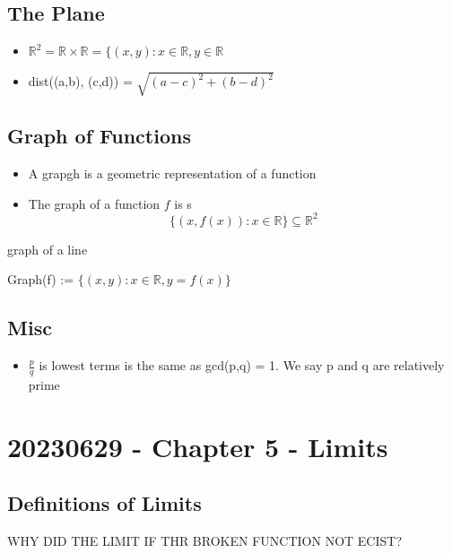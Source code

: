 \documentclass{report}
\begin{document}
  \subsection{The Plane}%
    \begin{itemize}
      \item $\mathbb{R}^2 = \mathbb{R} \times \mathbb{R} = 
        \{(x,y): x \in \mathbb{R}, y \in \mathbb{R}$
        \item dist((a,b), (c,d)) = $\sqrt{(a-c)^2 + (b-d)^2}$
    \end{itemize}

  \subsection{Graph of Functions}%
    \begin{itemize}
      \item A grapgh is a geometric representation of a function
      \item The graph of a function $f$ is
        s\[ \{(x, f(x)): x \in \mathbb{R}\} \subseteq \mathbb{R}^2 \]
    \end{itemize}
     {
       graph of a line
    }
  \item Graph(f) := $\{ (x,y): x \in \mathbb{R}, y = f(x) \}$

    \subsection{Misc}%
    \begin{itemize}
      \item $\frac{p}{q} $ is lowest terms is the same as gcd(p,q) = 1.
        We say p and q are relatively prime
    \end{itemize}
  
    
\section*{20230629 - Chapter 5 - Limits}
  \subsection{Definitions of Limits}%
    
    WHY DID THE LIMIT IF THR BROKEN FUNCTION NOT ECIST?

\end{document}

